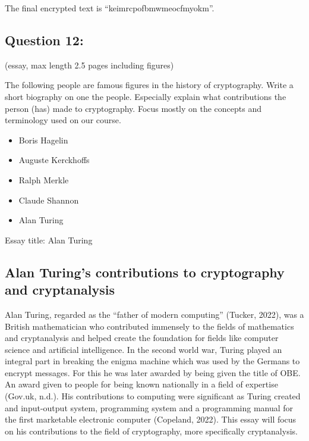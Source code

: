 \documentclass[11pt]{article}
\providecommand{\tightlist}{%
      \setlength{\itemsep}{0pt}\setlength{\parskip}{0pt}}
\begin{document}
The final encrypted text is ``keimrcpofbmwmeocfmyokm''.

    \hypertarget{question-12}{%
\subsection{Question 12:}\label{question-12}}

(essay, max length 2.5 pages including figures)

The following people are famous figures in the history of cryptography.
Write a short biography on one the people. Especially explain what
contributions the person (has) made to cryptography. Focus mostly on the
concepts and terminology used on our course.

\begin{itemize}
\tightlist
\item
  Boris Hagelin
\item
  Auguste Kerckhoffs
\item
  Ralph Merkle
\item
  Claude Shannon
\item
  Alan Turing
\end{itemize}

Essay title: Alan Turing

    \hypertarget{alan-turings-contributions-to-cryptography-and-cryptanalysis}{%
\subsection{Alan Turing's contributions to cryptography and
cryptanalysis}\label{alan-turings-contributions-to-cryptography-and-cryptanalysis}}

Alan Turing, regarded as the ``father of modern computing'' (Tucker,
2022), was a British mathematician who contributed immensely to the
fields of mathematics and cryptanalysis and helped create the foundation
for fields like computer science and artificial intelligence. In the
second world war, Turing played an integral part in breaking the enigma
machine which was used by the Germans to encrypt messages. For this he
was later awarded by being given the title of OBE. An award given to
people for being known nationally in a field of expertise (Gov.uk,
n.d.). His contributions to computing were significant as Turing created
and input-output system, programming system and a programming manual for
the first marketable electronic computer (Copeland, 2022). This essay
will focus on his contributions to the field of cryptography, more
specifically cryptanalysis.
\end{document}
